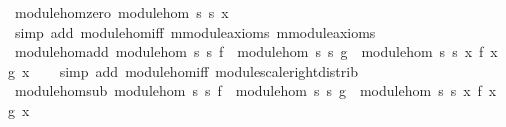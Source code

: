 \begin{isabellebody}
\isanewline
\isanewline
{}\isamarkupfalse%
\ module{\isacharunderscore}{\kern0pt}hom{\isacharunderscore}{\kern0pt}zero{\isacharcolon}{\kern0pt}\ {\isachardoublequoteopen}module{\isacharunderscore}{\kern0pt}hom\ s{}\ s{}\ {\isacharparenleft}{\kern0pt}{\isasymlambda}x{\isachardot}{\kern0pt}\ {}{\isacharparenright}{\kern0pt}{\isachardoublequoteclose}\isanewline
%
\isadelimproof
\ \ %
\endisadelimproof
%
\isatagproof
{}\isamarkupfalse%
\ {\isacharparenleft}{\kern0pt}simp\ add{\isacharcolon}{\kern0pt}\ module{\isacharunderscore}{\kern0pt}hom{\isacharunderscore}{\kern0pt}iff\ m{}{\isachardot}{\kern0pt}module{\isacharunderscore}{\kern0pt}axioms\ m{}{\isachardot}{\kern0pt}module{\isacharunderscore}{\kern0pt}axioms{\isacharparenright}{\kern0pt}%
\endisatagproof
{\isafoldproof}%
%
\isadelimproof
\isanewline
%
\endisadelimproof
\isanewline
{}\isamarkupfalse%
\ module{\isacharunderscore}{\kern0pt}hom{\isacharunderscore}{\kern0pt}add{\isacharcolon}{\kern0pt}\ {\isachardoublequoteopen}module{\isacharunderscore}{\kern0pt}hom\ s{}\ s{}\ f\ {\isasymLongrightarrow}\ module{\isacharunderscore}{\kern0pt}hom\ s{}\ s{}\ g\ {\isasymLongrightarrow}\ module{\isacharunderscore}{\kern0pt}hom\ s{}\ s{}\ {\isacharparenleft}{\kern0pt}{\isasymlambda}x{\isachardot}{\kern0pt}\ f\ x\ {\isacharplus}{\kern0pt}\ g\ x{\isacharparenright}{\kern0pt}{\isachardoublequoteclose}\isanewline
%
\isadelimproof
\ \ %
\endisadelimproof
%
\isatagproof
{}\isamarkupfalse%
\ {\isacharparenleft}{\kern0pt}simp\ add{\isacharcolon}{\kern0pt}\ module{\isacharunderscore}{\kern0pt}hom{\isacharunderscore}{\kern0pt}iff\ module{\isachardot}{\kern0pt}scale{\isacharunderscore}{\kern0pt}right{\isacharunderscore}{\kern0pt}distrib{\isacharparenright}{\kern0pt}%
\endisatagproof
{\isafoldproof}%
%
\isadelimproof
\isanewline
%
\endisadelimproof
\isanewline
{}\isamarkupfalse%
\ module{\isacharunderscore}{\kern0pt}hom{\isacharunderscore}{\kern0pt}sub{\isacharcolon}{\kern0pt}\ {\isachardoublequoteopen}module{\isacharunderscore}{\kern0pt}hom\ s{}\ s{}\ f\ {\isasymLongrightarrow}\ module{\isacharunderscore}{\kern0pt}hom\ s{}\ s{}\ g\ {\isasymLongrightarrow}\ module{\isacharunderscore}{\kern0pt}hom\ s{}\ s{}\ {\isacharparenleft}{\kern0pt}{\isasymlambda}x{\isachardot}{\kern0pt}\ f\ x\ {\isacharminus}{\kern0pt}\ g\ x{\isacharparenright}{\kern0pt}{\isachardoublequoteclose}\isanewline

\end{isabellebody}
